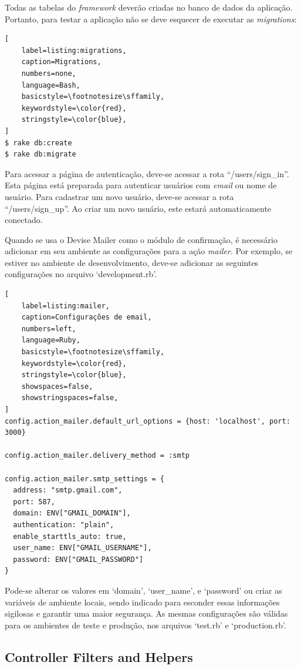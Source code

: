 Todas as tabelas do \textit{framework} deverão criadas no banco de dados da aplicação. Portanto, para testar a aplicação não se deve esquecer de executar as \textit{migrations}:

\begin{lstlisting}[
    label=listing:migrations,
    caption=Migrations,
    numbers=none,
    language=Bash,
    basicstyle=\footnotesize\sffamily,
    keywordstyle=\color{red},
    stringstyle=\color{blue},
]
$ rake db:create
$ rake db:migrate
\end{lstlisting}

Para acessar a página de autenticação, deve-se acessar a rota ``/users/sign\_in''. Esta página está preparada para autenticar usuários com \textit{email} ou nome de usuário. Para cadastrar um novo usuário, deve-se acessar a rota ``/users/sign\_up''. Ao criar um novo usuário, este estará automaticamente conectado.

Quando se usa o Devise Mailer como o módulo de confirmação, é necessário adicionar em seu ambiente as configurações para a ação \textit{mailer}. Por exemplo, se estiver no ambiente de desenvolvimento, deve-se adicionar as seguintes configurações no arquivo `development.rb'.

\begin{lstlisting}[
    label=listing:mailer,
    caption=Configurações de email,
    numbers=left,
    language=Ruby,
    basicstyle=\footnotesize\sffamily,
    keywordstyle=\color{red},
    stringstyle=\color{blue},
    showspaces=false,
    showstringspaces=false,
]
config.action_mailer.default_url_options = {host: 'localhost', port: 3000}

config.action_mailer.delivery_method = :smtp

config.action_mailer.smtp_settings = {
  address: "smtp.gmail.com",
  port: 587,
  domain: ENV["GMAIL_DOMAIN"],
  authentication: "plain",
  enable_starttls_auto: true,
  user_name: ENV["GMAIL_USERNAME"],
  password: ENV["GMAIL_PASSWORD"]
}
\end{lstlisting}

Pode-se alterar os valores em `domain', `user\_name', e `password' ou criar as variáveis de ambiente locais, sendo indicado para esconder essas informações sigilosas e garantir uma maior segurança. As mesmas configurações são válidas para os ambientes de teste e produção, nos arquivos `test.rb' e `production.rb'.

\subsection{Controller Filters and Helpers}

